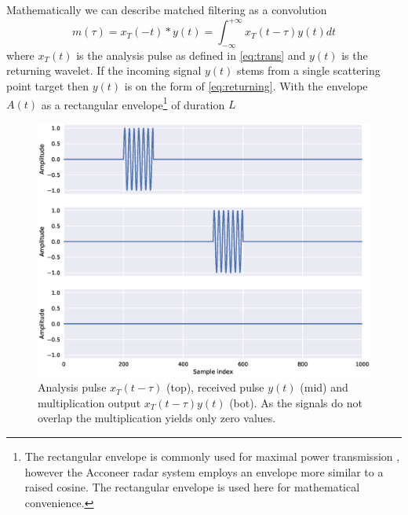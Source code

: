 Mathematically we can describe matched filtering as a convolution
\begin{equation}
	m(\tau) 
	= x_T(-t) * y(t)
	= \int_{-\infty}^{+\infty} x_T(t - \tau)y(t) dt
\end{equation}
where $x_T(t)$ is the analysis pulse as defined in \eqref{eq:trans} and $y(t)$ is the returning wavelet. If the incoming signal $y(t)$ stems from a single scattering point target then $y(t)$ is on the form of \eqref{eq:returning}. With the envelope $A(t)$ as a rectangular envelope\footnote{The rectangular envelope is commonly used for maximal power transmission \citep{richards_2014}, however the Acconeer radar system employs an envelope more similar to a raised cosine. The rectangular envelope is used here for mathematical convenience.} of duration $L$

\begin{figure}[t]
	\centering
	\includegraphics[scale=0.5]{figs_temp/mixing0}
	\caption{Analysis pulse $x_T(t-\tau)$ (top), received pulse $y(t)$ (mid) and multiplication output $x_T(t-\tau)y(t)$ (bot). As the signals do not overlap the multiplication yields only zero values.}
	\label{fig:mix0}
\end{figure}

